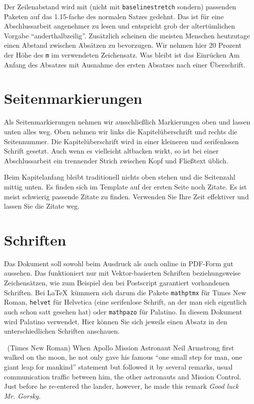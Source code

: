 \documentclass[11pt,a4paper]{report}
\begin{document}
Der Zeilenabstand wird mit 
(nicht mit \verb|baselinestretch| sondern) passenden Paketen 
auf das 1.15-fache des normalen Satzes gedehnt. 
Das ist für eine Abschlussarbeit angenehmer zu lesen und
entspricht grob der altertümlichen Vorgabe "`anderthalbzeilig"'.
Zusätzlich scheinen die meisten Menschen heutzutage einen Abstand
zwischen Absätzen zu bevorzugen. 
Wir nehmen hier 20 Prozent der Höhe des \verb|m| im 
verwendeten Zeichensatz.
Was bleibt ist das Einrücken Am Anfang des Absatzes mit Ausnahme des 
ersten Absatzes nach einer Überschrift.


\section{Seitenmarkierungen}

Als Seitenmarkierungen nehmen wir ausschließlich Markierungen
oben und lassen unten alles weg. 
Oben nehmen wir links die Kapitelüberschrift und rechts
die Seitennummer. 
Die Kapitelüberschrift wird in einer kleineren und 
serifenlosen Schrift gesetzt.
Auch wenn es vielleicht altbacken wirkt, so ist bei einer
Abschlussarbeit ein trennender Strich zwischen Kopf und 
Fließtext üblich.

Beim Kapitelanfang bleibt traditionell nichts oben stehen 
und die Seitenzahl mittig unten.
Es finden sich im Template auf der ersten Seite noch Zitate.
Es ist meist schwierig passende Zitate zu finden.
Verwenden Sie Ihre Zeit effektiver und lassen Sie die Zitate weg.


\section{Schriften}

Das Dokument soll sowohl beim Ausdruck als auch online in
PDF-Form gut aussehen. 
Das funktioniert nur mit Vektor-basierten Schriften beziehungsweise
Zeichensätzen, wie zum Beispiel den bei Postscript garantiert 
vorhandenen Schriften.
Bei \LaTeX\ kümmern sich darum die Pakete \verb|mathptmx| für
Times New Roman, \verb|helvet| für Helvetica (eine serifenlose
Schrift, an der man sich eigentlich auch schon satt gesehen 
hat) oder \verb|mathpazo| für Palatino. 
In diesem Dokument wird Palatino verwendet.
Hier können Sie sich jeweils einen Absatz in den unterschiedlichen 
Schriften anschauen.

\noindent\parbox[t]{\textwidth}{
\fontsize{11}{13pt}\selectfont \ 
(Times New Roman) When Apollo Mission Astronaut Neil Armstrong first 
walked on the moon, he not only gave his famous ``one small step 
for man, one giant leap for mankind'' statement but followed it by 
several remarks, usual communication traffic between him, the other
astronauts and Mission Control. 
Just before he re-entered the lander, however, he made this 
remark \textit{Good luck Mr. Gorsky}.
}
\end{document}
